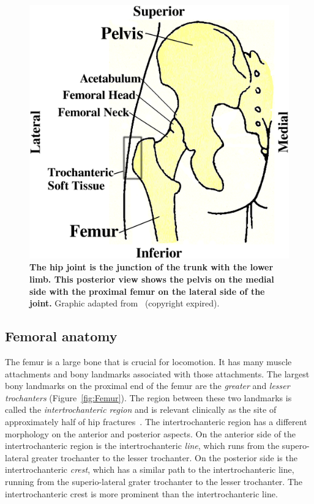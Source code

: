\begin{figure}
\includegraphics[width=\hsize]{./intro/Figures/Hip_Grays}
\caption[The hip joint]{\textbf{The hip joint is the junction of the trunk with the lower limb. This posterior view shows the pelvis on the medial side with the proximal femur on the lateral side of the joint.} Graphic adapted from~\citet{gray_anatomy_1918} (copyright expired).}
\label{fig:Hip}
\end{figure}

\subsection{Femoral anatomy}
\label{sec:intro_hipAnat_femur}
The femur is a large bone that is crucial for locomotion.
It has many muscle attachments and bony landmarks associated with those attachments.
The largest bony landmarks on the proximal end of the femur are the \textit{greater} and \textit{lesser trochanters} (Figure~\ref{fig:Femur}).
The region between these two landmarks is called the \textit{intertrochanteric region} and is relevant clinically as the site of approximately half of hip fractures~\citep{michelson_epidemiology_1995, lyritis_epidemiology_1996, sirois_burden_2009, lefaivre_changes_2011, poole_cortical_2012}.
The intertrochanteric region has a different morphology on the anterior and posterior aspects.
On the anterior side of the intertrochanteric region is the intertrochanteric \textit{line}, which runs from the supero-lateral greater trochanter to the lesser trochanter. On the posterior side is the intertrochanteric \textit{crest}, which has a similar path to the intertrochanteric line, running from the superio-lateral grater trochanter to the lesser trochanter.
The intertrochanteric crest is more prominent than the intertrochanteric line.

